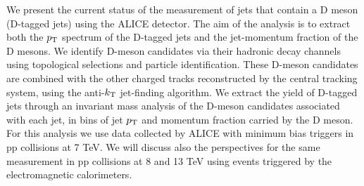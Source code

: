\documentclass[12pt]{article}
\begin{document}
We present the current status of the measurement of jets that contain a D meson (D-tagged jets) using the ALICE detector.
The aim of the analysis is to extract both the $p_{\rm T}$ spectrum of the D-tagged jets and the jet-momentum fraction of the D mesons. 
We identify D-meson candidates via their hadronic decay channels using topological selections and particle identification.
These D-meson candidates are combined with the other charged tracks reconstructed by the central tracking system, 
using the anti-$k_{\rm T}$ jet-finding algorithm.
We extract the yield of D-tagged jets through an invariant mass analysis of the D-meson candidates associated with each jet, 
in bins of jet $p_{\rm T}$ and momentum fraction carried by the D meson. 
For this analysis we use data collected
by ALICE with minimum bias triggers in pp collisions at 7 TeV. We will discuss also
the perspectives for the same measurement in pp collisions at 8 and 13 TeV using events triggered
by the electromagnetic calorimeters.
\end{document}
